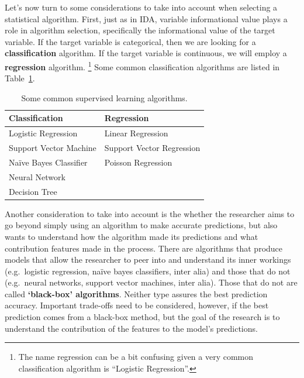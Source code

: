 \documentclass[
  letterpaper,
]{latex/krantz}
\begin{document}
Let's now turn to some considerations to take into account when
selecting a statistical algorithm. First, just as in IDA, variable
informational value plays a role in algorithm selection, specifically
the informational value of the target variable. If the target variable
is categorical, then we are looking for a \textbf{classification}
algorithm. If the target variable is continuous, we will employ a
\textbf{regression} algorithm. \footnote{The name regression can be a
  bit confusing given a very common classification algorithm is
  ``Logistic Regression''.} Some common classification algorithms are
listed in Table~\ref{tbl-pda-algorithms}.

\hypertarget{tbl-pda-algorithms}{}
\begin{table}
\caption{\label{tbl-pda-algorithms}Some common supervised learning algorithms. }\tabularnewline

\centering
\begin{tabular}{ll}
\toprule
Classification & Regression\\
\midrule
Logistic Regression & Linear Regression\\
Support Vector Machine & Support Vector Regression\\
Naïve Bayes Classifier & Poisson Regression\\
Neural Network & \\
Decision Tree & \\
\bottomrule
\end{tabular}
\end{table}

\begin{table}

\end{table}

\begin{table}

\end{table}

Another consideration to take into account is the whether the researcher
aims to go beyond simply using an algorithm to make accurate
predictions, but also wants to understand how the algorithm made its
predictions and what contribution features made in the process. There
are algorithms that produce models that allow the researcher to peer
into and understand its inner workings (e.g.~logistic regression, naïve
bayes classifiers, inter alia) and those that do not (e.g.~neural
networks, support vector machines, inter alia). Those that do not are
called \textbf{`black-box' algorithms}. Neither type assures the best
prediction accuracy. Important trade-offs need to be considered,
however, if the best prediction comes from a black-box method, but the
goal of the research is to understand the contribution of the features
to the model's predictions.
\end{document}
